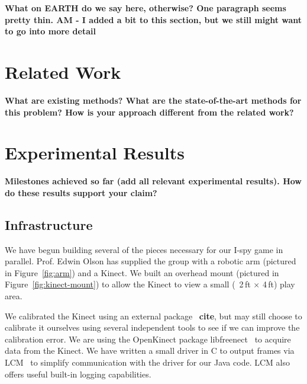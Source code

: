 \documentclass[11pt]{article}
\newcommand{\xxx}[1]{{\bf \color{red} #1}}
\begin{document}
\xxx{What on EARTH do we say here, otherwise? One paragraph seems pretty
    thin. AM - I added a bit to this section, but we still might want to go into more detail}

\section{Related Work}
\xxx{What are existing methods? What are the state-of-the-art methods for this
    problem? How is your approach different from the related work?}

\section{Experimental Results}
\xxx{Milestones achieved so far (add all relevant experimental results). How
    do these results support your claim?}
\subsection{Infrastructure}
We have begun building several of the pieces necessary for our I-spy
game in parallel.  Prof. Edwin Olson has supplied the group with a robotic
arm (pictured in Figure~\ref{fig:arm}) and a Kinect.  We built an
overhead mount (pictured in Figure~\ref{fig:kinect-mount}) to allow the Kinect 
to view a small (~2\,ft $\times$ 4\,ft) play area.

We calibrated the Kinect using an external package~\xxx{cite}, but may still
choose to calibrate it ourselves using several independent tools to see if we
can improve the calibration error. We are using the OpenKinect
package libfreenect~\cite{OpenKinect} to acquire data from the Kinect.  We have
written a small driver in C to output frames via LCM~\cite{huang2010} to simplify
communication with the driver for our Java code.  LCM also offers useful
built-in logging capabilities.
\end{document}
